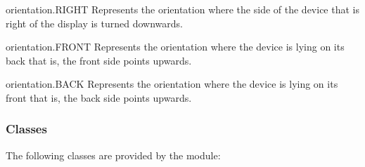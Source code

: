\begin{memberdesc}{orientation.RIGHT}
Represents the orientation where the side of the device that is right of the display is turned downwards.
\end{memberdesc}

\begin{memberdesc}{orientation.FRONT}
Represents the orientation where the device is lying on its back that is, the front side points upwards.
\end{memberdesc}

\begin{memberdesc}{orientation.BACK}
Represents the orientation where the device is lying on its front that is, the back side points upwards.
\end{memberdesc}

\subsubsection{Classes}

The following classes are provided by the  module:

